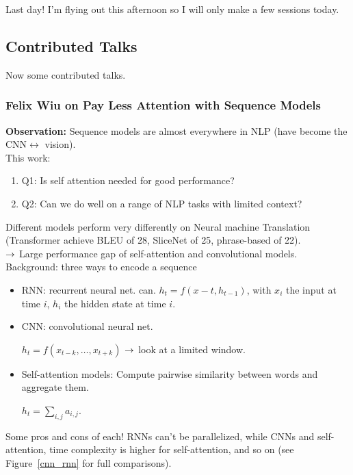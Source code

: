 Last day! I'm flying out this afternoon so I will only make a few sessions today.


\subsection{Contributed Talks}

Now some contributed talks.

\subsubsection{Felix Wiu on Pay Less Attention with Sequence Models~\cite{wu2019pay}}

{\bf Observation:} Sequence models are almost everywhere in NLP (have become the CNN$\leftrightarrow$ vision). \\

This work:
\begin{enumerate}
    \item Q1: Is self attention needed for good performance?
    \item Q2: Can we do well on a range of NLP tasks with limited context?
\end{enumerate}

Different models perform very differently on Neural machine Translation (Transformer achieve BLEU of 28, SliceNet of 25, phrase-based of 22). \\

$\rightarrow$ Large performance gap of self-attention and convolutional models. \\

Background: three ways to encode a sequence
\begin{itemize}
    \item RNN: recurrent neural net.
     can.
    $h_t = f(x-t, h_{t-1})$, with $x_i$ the input at time $i$, $h_i$ the hidden state at time $i$.
    
    \item CNN: convolutional neural net.
    
    $h_t = f(x_{t-k}, \ldots, x_{t+k})$ $\rightarrow$ look at a limited window.
    
    \item Self-attention models: Compute pairwise similarity between words and aggregate them.
    
    $h_t = \sum_{i,j} a_{i,j}$.
\end{itemize}

Some pros and cons of each! RNNs can't be parallelized, while CNNs and self-attention, time complexity is higher for self-attention, and so on (see Figure~\ref{cnn_rnn} for full comparisons). \\

